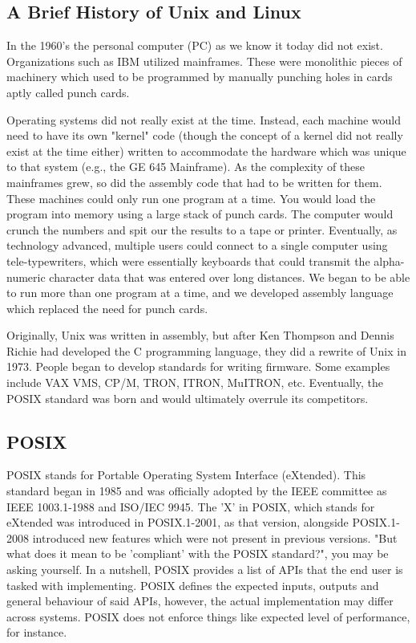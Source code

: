 \documentclass{article}
\begin{document}
\subsection{A Brief History of Unix and Linux}

In the 1960's the personal computer (PC) as we know it today did not exist. Organizations such as IBM utilized
mainframes. These were monolithic pieces of machinery which used to be programmed by manually punching holes
in cards aptly called punch cards.

Operating systems did not really exist at the time. Instead, each machine would need to have its own "kernel"
code (though the concept of a kernel did not really exist at the time either) written to accommodate the
hardware which was unique to that system (e.g., the GE 645 Mainframe). As the complexity of these mainframes
grew, so did the assembly code that had to be written for them. These machines could only run one program at a
time. You would load the program into memory using a large stack of punch cards. The computer would crunch the
numbers and spit our the results to a tape or printer. Eventually, as technology advanced, multiple users
could connect to a single computer using tele-typewriters, which were essentially keyboards that could
transmit the alpha-numeric character data that was entered over long distances. We began to be able to run
more than one program at a time, and we developed assembly language which replaced the need for punch cards.

Originally, Unix was written in assembly, but after Ken Thompson and Dennis Richie had developed the C
programming language, they did a rewrite of Unix in 1973. People began to develop standards for writing
firmware. Some examples include VAX VMS, CP/M, TRON, ITRON, MuITRON, etc. Eventually, the POSIX standard was
born and would ultimately overrule its competitors.

\subsection{POSIX}

POSIX stands for Portable Operating System Interface (eXtended). This standard began in 1985 and was
officially adopted by the IEEE committee as IEEE 1003.1-1988 and ISO/IEC 9945. The 'X' in POSIX, which stands
for eXtended was introduced in POSIX.1-2001, as that version, alongside POSIX.1-2008 introduced new features
which were not present in previous versions. "But what does it mean to be 'compliant' with the POSIX standard?",
you may be asking yourself. In a nutshell, POSIX provides a list of APIs that the end user is tasked with
implementing. POSIX defines the expected inputs, outputs and general behaviour of said APIs, however, the
actual implementation may differ across systems. POSIX does not enforce things like expected level of
performance, for instance.
\end{document}

